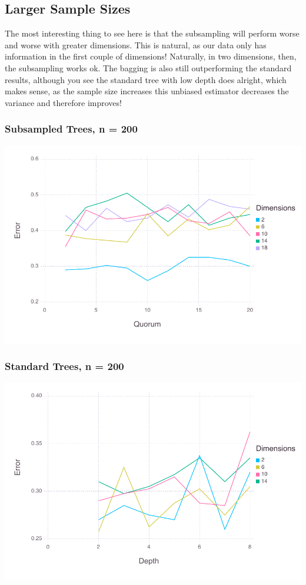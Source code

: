 \documentclass[a4paper,12pt]{article}
\begin{document}
\subsection*{Larger Sample Sizes}
The most interesting thing to see here is that the subsampling will perform worse and worse with greater dimensions. This is natural, as our data only has information in the first couple of dimensions! Naturally, in two dimensions, then, the subsampling works ok. The bagging is also still outperforming the standard results, although you see the standard tree with low depth does alright, which makes sense, as the sample size increases this unbiased estimator decreases the variance and therefore improves!

\subsubsection*{Subsampled Trees, n = 200}
\includegraphics[width=\linewidth]{figures/problemset_4_1.pdf}



\subsubsection*{Standard Trees, n = 200}
\includegraphics[width=\linewidth]{figures/problemset_5_1.pdf}
\end{document}
